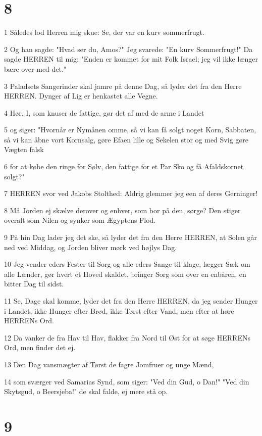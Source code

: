 \chapter{8}

\par 1 Således lod Herren mig skue: Se, der var en kurv sommerfrugt.
\par 2 Og han sagde: "Hvad ser du, Amos?" Jeg svarede: "En kurv Sommerfrugt!" Da sagde HERREN til mig: "Enden er kommet for mit Folk Israel; jeg vil ikke længer bære over med det."
\par 3 Paladsets Sangerinder skal jamre på denne Dag, så lyder det fra den Herre HERREN. Dynger af Lig er henkastet alle Vegne.
\par 4 Hør, I, som knuser de fattige, gør det af med de arme i Landet
\par 5 og siger: "Hvornår er Nymånen omme, så vi kan få solgt noget Korn, Sabbaten, så vi kan åbne vort Kornsalg, gøre Efaen lille og Sekelen stor og med Svig gøre Vægten falsk
\par 6 for at købe den ringe for Sølv, den fattige for et Par Sko og få Afaldskornet solgt?"
\par 7 HERREN svor ved Jakobs Stolthed: Aldrig glemmer jeg een af deres Gerninger!
\par 8 Må Jorden ej skælve derover og enhver, som bor på den, sørge? Den stiger overalt som Nilen og synker som Ægyptens Flod.
\par 9 På hin Dag lader jeg det ske, så lyder det fra den Herre HERREN, at Solen går ned ved Middag, og Jorden bliver mørk ved højlys Dag.
\par 10 Jeg vender eders Fester til Sorg og alle eders Sange til klage, lægger Sæk om alle Lænder, gør hvert et Hoved skaldet, bringer Sorg som over en enbåren, en bitter Dag til sidst.
\par 11 Se, Dage skal komme, lyder det fra den Herre HERREN, da jeg sender Hunger i Landet, ikke Hunger efter Brød, ikke Tørst efter Vand, men efter at høre HERRENs Ord.
\par 12 Da vanker de fra Hav til Hav, flakker fra Nord til Øst for at søge HERRENs Ord, men finder det ej.
\par 13 Den Dag vansmægter af Tørst de fagre Jomfruer og unge Mænd,
\par 14 som sværger ved Samarias Synd, som siger: "Ved din Gud, o Dan!" "Ved din Skytsgud, o Beersjeba!" de skal falde, ej mere stå op.

\chapter{9}

